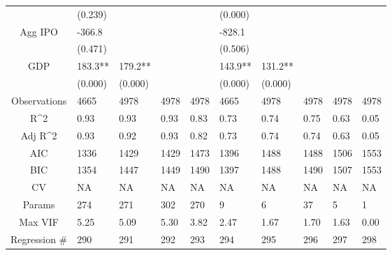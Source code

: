 \documentclass{article}
\begin{document}
\begin{table}[H]
\begin{tabular}{|clllllllll|}
   & (0.239) &  &  &  & (0.000) &  &  &  &  \\
  Agg IPO & -366.8 &  &  &  & -828.1 &  &  &  &  \\
   & (0.471) &  &  &  & (0.506) &  &  &  &  \\
  GDP & 183.3** & 179.2** &  &  & 143.9** & 131.2** &  &  &  \\
   & (0.000) & (0.000) &  &  & (0.000) & (0.000) &  &  &  \\
  \hline
 Observations & 4665 & 4978 & 4978 & 4978 & 4665 & 4978 & 4978 & 4978 & 4978 \\
  R^2 & 0.93 & 0.93 & 0.93 & 0.83 & 0.73 & 0.74 & 0.75 & 0.63 & 0.05 \\
  Adj R^2 & 0.93 & 0.92 & 0.93 & 0.82 & 0.73 & 0.74 & 0.74 & 0.63 & 0.05 \\
  AIC & 1336 & 1429 & 1429 & 1473 & 1396 & 1488 & 1488 & 1506 & 1553 \\
  BIC & 1354 & 1447 & 1449 & 1490 & 1397 & 1488 & 1490 & 1507 & 1553 \\
  CV & NA & NA & NA & NA & NA & NA & NA & NA & NA \\
  Params & 274 & 271 & 302 & 270 & 9 & 6 & 37 & 5 & 1 \\
  Max VIF & 5.25 & 5.09 & 5.30 & 3.82 & 2.47 & 1.67 & 1.70 & 1.63 & 0.00 \\
  Regression \# & 290 & 291 & 292 & 293 & 294 & 295 & 296 & 297 & 298 \\
   \hline
\end{tabular}

\end{table}
\end{document}
